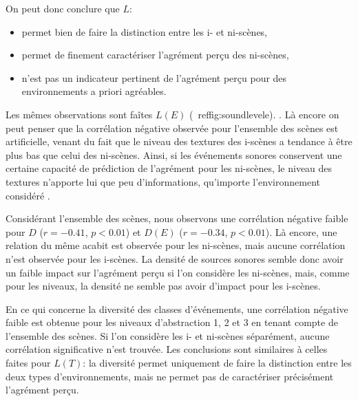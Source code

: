 On peut donc conclure que $L$:
\begin{itemize}
\item permet bien de faire la distinction entre les i- et ni-scènes,
\item permet de finement caractériser l'agrément perçu des ni-scènes,
\item n'est pas un indicateur pertinent de l'agrément perçu pour des environnements a priori agréables.
\end{itemize}

Les mêmes observations sont faîtes   $L(E)$ (\cf~ref{fig:soundlevele}).  . Là encore  on peut penser que la corrélation négative observée pour l'ensemble des scènes est artificielle, venant du fait que le niveau des textures des i-scènes a tendance à être plus bas que celui des ni-scènes. Ainsi, si les événements sonores conservent une certaine capacité de prédiction de l'agrément pour les ni-scènes, le niveau des textures n'apporte lui que peu d'informations, qu'importe l'environnement considéré .

Considérant l'ensemble des scènes, nous observons une corrélation négative faible pour $D$ ($r=-0.41$, $p<0.01$) et $D(E)$ ($r=-0.34$, $p<0.01$). Là encore, une relation du même acabit est observée pour les ni-scènes, mais aucune corrélation n'est observée pour les i-scènes. La densité de sources sonores semble donc avoir un faible impact sur l'agrément perçu si l'on considère les ni-scènes, mais, comme pour les niveaux, la densité ne semble pas avoir d'impact pour les i-scènes.

En ce qui concerne la diversité des classes d'événements, une corrélation négative faible est obtenue pour les niveaux d'abstraction 1, 2 et 3 en tenant compte de l'ensemble des scènes. Si l'on considère les i- et ni-scènes séparément, aucune corrélation significative n'est trouvée. Les conclusions sont similaires à celles faites pour $L(T)$: la diversité permet uniquement de faire la distinction entre les deux types d'environnements, mais ne permet pas de caractériser précisément l'agrément perçu.

